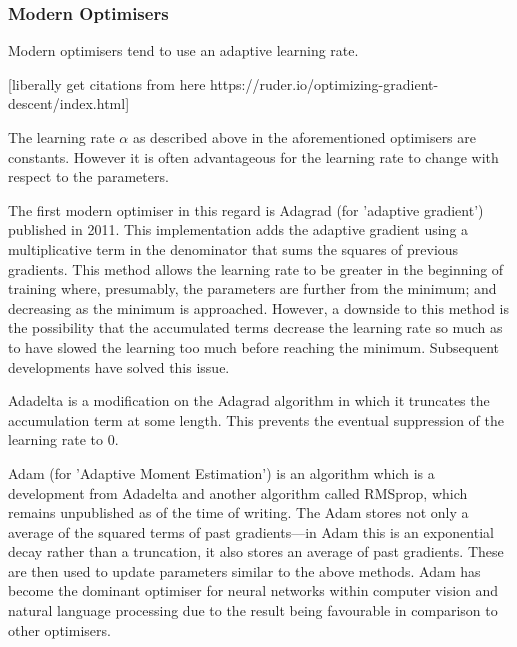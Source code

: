 \documentclass[a4paper,fleqn,usenatbib]{mnras}
\begin{document}
\subsubsection{Modern Optimisers}
\label{section:modern optimizers}
Modern optimisers tend to use an adaptive learning rate.

[liberally get citations from here https://ruder.io/optimizing-gradient-descent/index.html]

 The learning rate $\alpha$ as described above in the aforementioned optimisers are constants. However it is often advantageous for the learning rate to change with respect to the parameters.
 
 The first modern optimiser in this regard is Adagrad (for 'adaptive gradient') published in 2011. \cite{AdaGrad} This implementation adds the adaptive gradient using a multiplicative term in the denominator that sums the squares of previous gradients. This method allows the learning rate to be greater in the beginning of training where, presumably, the parameters are further from the minimum; and decreasing as the minimum is approached. However, a downside to this method is the possibility that the accumulated terms decrease the learning rate so much as to have slowed the learning too much before reaching the minimum. Subsequent developments have solved this issue. 
 
 Adadelta is a modification on the Adagrad algorithm in which it truncates the accumulation term at some length. This prevents the eventual suppression of the learning rate to 0. \cite{AdaDelta}
 
 Adam (for 'Adaptive Moment Estimation') is an algorithm which is a development from Adadelta and another algorithm called RMSprop, which remains unpublished as of the time of writing. The Adam stores not only a average of the squared terms of past gradients---in Adam this is an exponential decay rather than a truncation, it also stores an average of past gradients. These are then used to update parameters similar to the above methods. \cite{Adam} Adam has become the dominant optimiser for neural networks within computer vision and natural language processing due to the result being favourable in comparison to other optimisers. 
 
\end{document}
